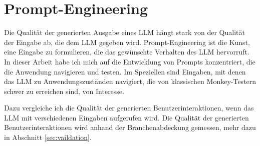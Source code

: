 \section{Prompt-Engineering}

Die Qualität der generierten Ausgabe eines LLM hängt stark von der Qualität der Eingabe ab, die dem LLM gegeben wird. \cite{chain-of-thought}
Prompt-Engineering ist die Kunst, eine Eingabe zu formulieren, die das gewünschte Verhalten des LLM hervorruft.
In dieser Arbeit habe ich mich auf die Entwicklung von Prompts konzentriert, die die Anwendung navigieren und testen.
Im Speziellen sind Eingaben, mit denen das LLM zu Anwendungszuständen navigiert, die von klassischen Monkey-Testern schwer zu erreichen sind, von Interesse.

Dazu vergleiche ich die Qualität der generierten Benutzerinteraktionen, wenn das LLM mit verschiedenen Eingaben aufgerufen wird.
Die Qualität der generierten Benutzerinteraktionen wird anhand der Branchenabdeckung gemessen, mehr dazu in Abschnitt \ref{sec:vaildation}.

